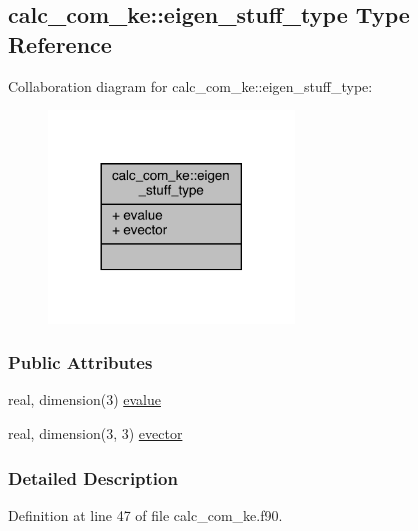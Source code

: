 \hypertarget{structcalc__com__ke_1_1eigen__stuff__type}{\subsection{calc\-\_\-com\-\_\-ke\-:\-:eigen\-\_\-stuff\-\_\-type Type Reference}
\label{structcalc__com__ke_1_1eigen__stuff__type}
}


Collaboration diagram for calc\-\_\-com\-\_\-ke\-:\-:eigen\-\_\-stuff\-\_\-type\-:
\nopagebreak
\begin{figure}[H]
\begin{center}
\leavevmode
\includegraphics[width=185pt]{structcalc__com__ke_1_1eigen__stuff__type__coll__graph}
\end{center}
\end{figure}
\subsubsection*{Public Attributes}
\begin{DoxyCompactItemize}
\item 
real, dimension(3) \hyperlink{structcalc__com__ke_1_1eigen__stuff__type_adc6524cb29363130d50b57a28eca3453}{evalue}
\item 
real, dimension(3, 3) \hyperlink{structcalc__com__ke_1_1eigen__stuff__type_a564110e1063d7391ad7e0a674aee4842}{evector}
\end{DoxyCompactItemize}


\subsubsection{Detailed Description}


Definition at line 47 of file calc\-\_\-com\-\_\-ke.\-f90.



